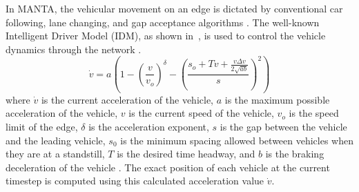 \documentclass[final]{IEEEtran}
\begin{document}
In MANTA, the vehicular movement on an edge is dictated by conventional car following, lane changing, and gap acceptance algorithms \cite{toledoMicroscopicTrafficSimulation2005}. The well-known Intelligent Driver Model (IDM), as shown in~, is used to control the vehicle dynamics through the network \cite{treiberTrafficFlowDynamics2013}.
\begin{equation} 
    \dot{v} = a (1 - (\frac{v}{v_o})^\delta - (\frac{s_o + Tv + \frac{v\Delta v}{2\sqrt{ab}}}{s})^2)
    \label{eq:idm}
\end{equation}
where $\dot{v}$ is the current acceleration of the vehicle, $a$ is the maximum possible acceleration of the vehicle, $v$ is the current speed of the vehicle, $v_o$ is the speed limit of the edge, $\delta$ is the acceleration exponent, $s$ is the gap between the vehicle and the leading vehicle, $s_0$ is the minimum spacing allowed between vehicles when they are at a standstill, $T$ is the desired time headway, and $b$ is the braking deceleration of the vehicle \cite{garcia-doradoDesigningLargescaleInteractive2014, waddellIntegratedPipelineArchitecture2018}. The exact position of each vehicle at the current timestep is computed using this calculated acceleration value $\dot{v}$.
\end{document}
